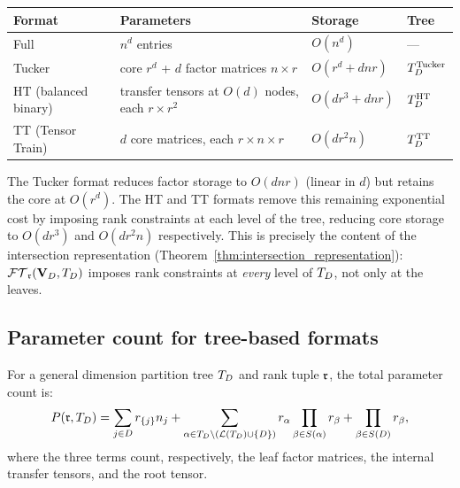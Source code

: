 \medskip
\begin{center}
\renewcommand{\arraystretch}{1.4}
\begin{tabular}{@{}llll@{}}
\toprule
\textbf{Format} & \textbf{Parameters}
    & \textbf{Storage} & \textbf{Tree}\\
\midrule
Full & $n^d$ entries & $O(n^d)$ & ---\\
Tucker & core $r^d$ + $d$ factor matrices $n\!\times\! r$
    & $O(r^d + dnr)$ & $T_D^{\mathrm{Tucker}}$\\
HT (balanced binary)
    & transfer tensors at $O(d)$ nodes, each $r\!\times\! r^2$
    & $O(dr^3 + dnr)$ & $T_D^{\mathrm{HT}}$\\
TT (Tensor Train)
    & $d$ core matrices, each $r\!\times\! n\!\times\! r$
    & $O(dr^2n)$ & $T_D^{\mathrm{TT}}$\\
\bottomrule
\end{tabular}
\end{center}
\medskip

\begin{remark}
\label{rem:app:scaling}
The Tucker format reduces factor storage to $O(dnr)$ (linear in $d$)
but retains the core at $O(r^d)$. The HT and TT formats remove this
remaining exponential cost by imposing rank constraints at each level
of the tree, reducing core storage to $O(dr^3)$ and $O(dr^2n)$
respectively. This is precisely the content of the intersection
representation (Theorem~\ref{thm:intersection_representation}):
$\mathcal{FT}_{\mathfrak{r}}(\mathbf{V}_D,T_D)$ imposes rank constraints at \emph{every} level of $T_D$,
not only at the leaves.
\end{remark}

\subsection*{Parameter count for tree-based formats}

For a general dimension partition tree $T_D$ and rank tuple $\mathfrak{r}$,
the total parameter count is:
\begin{equation}
\label{eq:app:param_count}
    P(\mathfrak{r},T_D)
    = \sum_{j \in D} r_{\{j\}} n_j
    + \sum_{\substack{\alpha \in T_D \setminus (\mathcal{L}(T_D) \cup \{D\})}}
      r_\alpha \prod_{\beta \in S(\alpha)} r_\beta
    + \prod_{\beta \in S(D)} r_\beta,
\end{equation}
where the three terms count, respectively, the leaf factor matrices,
the internal transfer tensors, and the root tensor.


